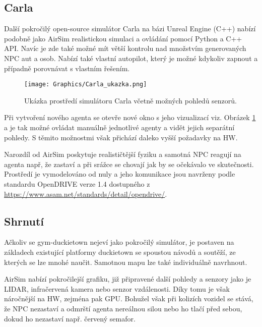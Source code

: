 \documentclass[czech, bc, kky, he, iso690alph]{fasthesis}
\begin{document}
	    	\subsection{Carla}
	    		Další pokročilý open-source simulátor Carla na bázi Unreal Engine (C++) nabízí podobně jako AirSim realistickou simulaci a ovládání pomocí Python a C++ API. Navíc je zde také možné mít větší kontrolu nad množstvím generovaných NPC aut a osob. Nabízí také vlastní autopilot, který je možné kdykoliv zapnout a případně porovnávat s vlastním řešením.
	    		
		    		\begin{figure}[h]
		    			\centering
		    			\texttt{[image: Graphics/Carla\_ukazka.png]}
		    			\caption{Ukázka prostředí simulátoru Carla včetně možných pohledů senzorů.}
		    			\label{pic:Carla_ukazka}
		    		\end{figure}
	    		
	    		Při vytvoření nového agenta se otevře nové okno s jeho vizualizací viz. Obrázek \ref{pic:Carla_ukazka} a je tak možné ovládat manuálně jednotlivé agenty a vidět jejich separátní pohledy. S těmito možnostmi však přichází daleko vyšší požadavky na HW.
	    		
	    		Narozdíl od AirSim poskytuje realističtější fyziku a samotná NPC reagují na agenta např, že zastaví a při srážce se chovají jak by se očekávalo ve skutečnosti. Prostředí je vymodelováno od nuly a jeho komunikace jsou navrženy podle standardu OpenDRIVE\textsuperscript{\textregistered} verze 1.4 dostupného z \href{https://www.asam.net/standards/detail/opendrive/}{https://www.asam.net/standards/detail/opendrive/}.
	    		
	    	\subsection{Shrnutí}
	    		Ačkoliv se gym-duckietown nejeví jako pokročilý simulátor, je postaven na základech existující platformy duckietown se spoustou návodů a soutěží, ze kterých se lze mnohé naučit. Samotnou mapu lze také individuálně navrhnout.
	    		
	    		AirSim nabízí pokročilejší grafiku, již připravené další pohledy a senzory jako je LIDAR, infračervená kamera nebo senzor vzdálenosti. Díky tomu je však náročnější na HW, zejména pak GPU. Bohužel však při kolizích vozidel se stává, že NPC nezastaví a odmrští agenta nereálnou silou nebo ho tlačí před sebou, dokud ho nezastaví např. červený semafor.
	    		
\end{document}
